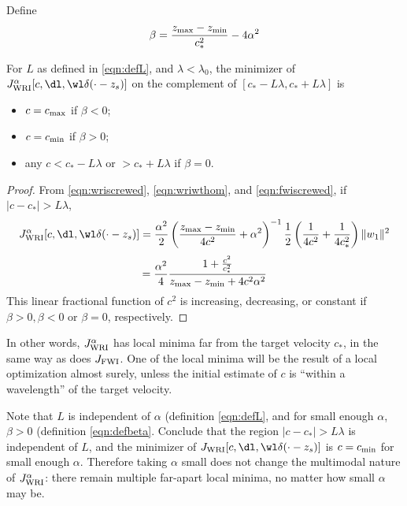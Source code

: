 Define
\begin{equation}
  \label{eqn:defbeta}
\beta = \frac{z_{\rm max}-z_{\rm min}}{c_*^2} - 4 \alpha^2
\end{equation}
\begin{theorem}
  \label{thm:thm2}
  For $L$ as defined in \ref{eqn:defL}, and $\lambda <
  \lambda_0$, the minimizer of $J_{\rm WRI}^{\alpha}[c,\dl,\wl \delta(\cdot-z_s)]$ on the
  complement of $[c_*-L\lambda, c_*+L\lambda]$ is
  \begin{itemize}
  \item $c=c_{\rm max}$ if $\beta<0$;
  \item $c=c_{\rm min}$ if $\beta>0$;
  \item any $c < c_*-L\lambda$ or $>c_*+L\lambda$ if $\beta=0$.
  \end{itemize}
\end{theorem}
\begin{proof}
  From \ref{eqn:wriscrewed}, \ref{eqn:wriwthom}, and
  \ref{eqn:fwiscrewed}, if $|c-c_*| > L\lambda$,
  \[
    J_{\rm WRI}^{\alpha}[c,\dl,\wl\delta(\cdot-z_s)] =
    \frac{\alpha^2}{2}\left(\frac{z_{\rm max}-z_{\rm
          min}}{4c^2}+\alpha^2\right)^{-1}\frac{1}{2}\left(\frac{1}{4c^2}+\frac{1}{4c_*^2}\right)\|w_1\|^2
  \]
  \[
    =
    \frac{\alpha^2}{4}\frac{1+\frac{c^2}{c_*^2}}{z_{\rm 
        max}-z_{\rm min}+4c^2\alpha^2}
  \]
  This linear fractional function of $c^2$ is increasing, decreasing,
  or constant if $\beta>0, \beta<0$ or $\beta=0$, respectively.
\end{proof}

In other words, $J_{\rm WRI}^{\alpha}$ has local minima far from the target
velocity $c_*$, in the same way as does $J_{\rm FWI}$. One of the
local minima will be the result of a local optimization almost surely,
unless the initial estimate of $c$ is ``within a wavelength'' of the
target velocity.

Note that $L$ is independent of $\alpha$ (definition \ref{eqn:defL},
and for small enough $\alpha$, $\beta > 0$ (definition
\ref{eqn:defbeta}. Conclude that the region $|c-c_*| > L\lambda$ is
independent of $L$, and the minimizer of $J_{\rm
  WRI}[c,\dl,\wl\delta(\cdot-z_s)]$ is $c=c_{\rm min}$ for small
enough $\alpha$. Therefore taking $\alpha$ small does not change the
multimodal nature of $J_{\rm WRI}^{\alpha}$: there remain multiple far-apart
local minima, no matter how small $\alpha$ may be.

